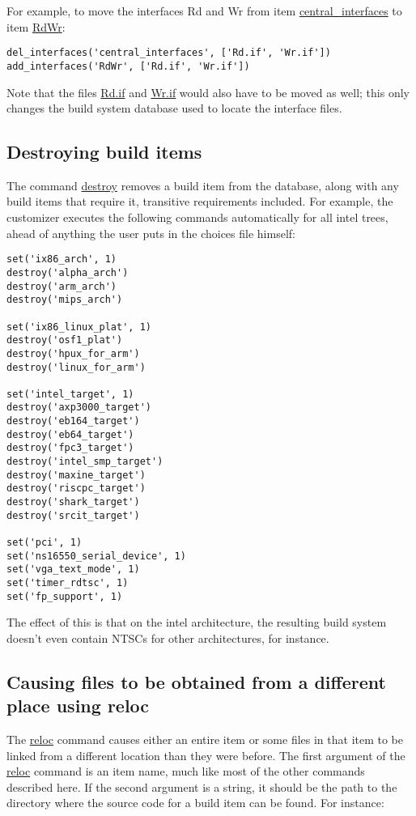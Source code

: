 \documentclass[a4paper]{article}
\begin{document}
For example, to move the interfaces Rd and Wr from item
\url{central_interfaces} to item \url{RdWr}:

\begin{verbatim}
del_interfaces('central_interfaces', ['Rd.if', 'Wr.if'])
add_interfaces('RdWr', ['Rd.if', 'Wr.if'])
\end{verbatim}

Note that the files \url{Rd.if} and \url{Wr.if} would also have to be
moved as well; this only changes the build system database used to
locate the interface files.

\subsection{Destroying build items}

The command \url{destroy} removes a build item from the database,
along with any build items that require it, transitive requirements
included. For example, the customizer executes the following commands
automatically for all intel trees, ahead of anything the user puts in
the choices file himself:

\begin{small}
\begin{verbatim}
set('ix86_arch', 1)
destroy('alpha_arch')
destroy('arm_arch')
destroy('mips_arch')

set('ix86_linux_plat', 1)
destroy('osf1_plat')
destroy('hpux_for_arm')
destroy('linux_for_arm')

set('intel_target', 1)
destroy('axp3000_target')
destroy('eb164_target')
destroy('eb64_target')
destroy('fpc3_target')
destroy('intel_smp_target')
destroy('maxine_target')
destroy('riscpc_target')
destroy('shark_target')
destroy('srcit_target')

set('pci', 1)
set('ns16550_serial_device', 1)
set('vga_text_mode', 1)
set('timer_rdtsc', 1)
set('fp_support', 1)
\end{verbatim}
\end{small}

The effect of this is that on the intel architecture, the resulting
build system doesn't even contain NTSCs for other architectures, for
instance.

\subsection{Causing files to be obtained from a different place using reloc}
The \url{reloc} command causes either an entire item or some files in
that item to be linked from a different location than they were
before. The first argument of the \url{reloc} command is an item name,
much like most of the other commands described here. If the second
argument is a string, it should be the path to the directory where the
source code for a build item can be found. For instance:
\end{document}

